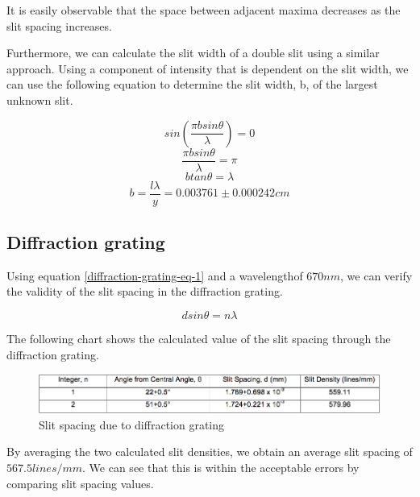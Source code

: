 \documentclass{article}
\begin{document}
It is easily observable that the space between adjacent maxima decreases as the
slit spacing increases.

Furthermore, we can calculate the slit width of a double slit using a similar
approach. Using a component of intensity that is dependent on the slit width, we
can use the following equation to determine the slit width, b, of the largest
unknown slit.

\begin{equation}
    \label{slit-width-1}
    sin(\frac{\pi b sin\theta}{\lambda}) = 0
\end{equation}
\begin{equation}
    \label{slit-width-2}
    \frac{\pi b sin\theta}{\lambda} = \pi 
\end{equation}
\begin{equation}
    \label{slit-width-3}
    b tan\theta = \lambda
\end{equation}
\begin{equation}
    \label{slit-width-4}
    b = \frac{l\lambda}{y} = 0.003761 \pm 0.000242 cm
\end{equation}

\subsection{Diffraction grating}

Using equation \ref{diffraction-grating-eq-1} and a wavelengthof $670 nm$, we
can verify the validity of the slit spacing in the diffraction grating.

\begin{equation}
    \label{diffraction-grating-eq-1}
    d sin\theta = n\lambda
\end{equation}

The following chart shows the calculated value of the slit spacing through the
diffraction grating.

\begin{figure}[H]
    \centering
    \includegraphics[width=\textwidth]{charts/diffraction-grating-chart}
    \caption{Slit spacing due to diffraction grating}
    \label{diffraction-grating-chart}
\end{figure}

By averaging the two calculated slit densities, we obtain an average slit
spacing of $567.5 lines/mm$. We can see that this is within the acceptable
errors by comparing slit spacing values.
\end{document}
